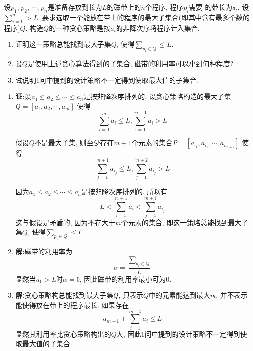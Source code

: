 \begin{problem}[习题4.3]
设$p_1$, $p_2$, $\cdots$, $p_n$是准备存放到长为$L$的磁带上的$n$个程序, 程序$p_i$需要
的带长为$a_i$. 设$\sum_{i=1}^n>L$, 要求选取一个能放在带上的程序的最大子集合(即其中含有最多个数的程序)$Q$. 构造$Q$的一种贪心策略是按$a_i$的非降次序将程序计入集合.
\begin{enumerate}
\item 证明这一策略总能找到最大子集$Q$, 使得$\sum_{p_i\in Q}\leq L$.
\item 设$Q$是使用上述贪心算法得到的子集合, 磁带的利用率可以小到何种程度?
\item 试说明1问中提到的设计策略不一定得到使取最大值的子集合.
\end{enumerate}
\end{problem}

\begin{solution}
\begin{enumerate}
\item \textbf{证:}设$a_1\leq a_2\leq \cdots\leq a_n$是按非降次序排列的. 设贪心策略构造的最大子集$Q=[a_1, a_2, \cdots, a_m]$ 使得
    \[\sum_{i=1}^m a_i\leq L ,  \sum_{i=1}^{m+1} a_i> L\]

    假设$Q$不是最大子集, 则至少存在$m+1$个元素的集合$P=[a_{i_1}, a_{i_2}, \cdots, a_{i_{m+1}}]$ 使得
    \[\sum_{j=1}^{m+1} a_{i_j}\leq L ,  \sum_{j=1}^{m+2} a_{i_j}> L\]

    因为$a_1\leq a_2\leq \cdots\leq a_n$是按非降次序排列的, 所以有
    \[
    L<\sum_{i=1}^{m+1} a_i < \sum_{j=1}^{m+1} a_{i_j}
    \]
    这与假设是矛盾的, 因为不存大于$m$个元素的集合, 即这一策略总能找到最大子集$Q$, 使得$\sum_{p_i\in Q}\leq L$.
\item \textbf{解:}磁带的利用率为
\[
\alpha=\frac{\sum_{p_i\in Q}}{L}
\]
显然当$a_1>L$时$\alpha=0$, 因此磁带的利用率最小可为$0$.
\item \textbf{解:}贪心策略构总能找到最大子集$Q$, 只表示$Q$中的元素能达到最大$m$, 并不表示能使得放在带上的程序最长. 如果存在
    \[a_{m+1}+\sum_{i=1}^{m-1} a_i\leq L\]
    显然其利用率比贪心策略构出的$Q$大, 因此1问中提到的设计策略不一定得到使取最大值的子集合.
\end{enumerate}
\end{solution}
